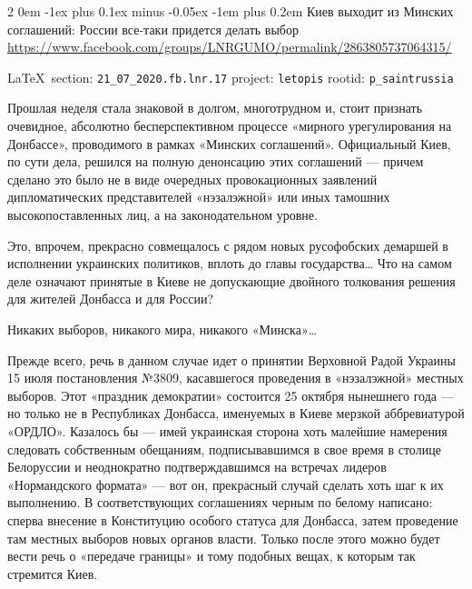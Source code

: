 \documentclass[a4paper,11pt]{extreport}
\makeatletter
\renewcommand\subsection{%
  \clearpage
    \@startsection{subsection}%
    {2}%
    {0em}%
    {-1ex plus 0.1ex minus -0.05ex}%
    {-1em plus 0.2em}%
    {\scshape\bfseries\Large}%
}
\makeatother
\begin{document}
 
\subsection{Киев выходит из Минских соглашений: России все-таки придется делать выбор}
\label{sec:21_07_2020.fb.lnr.17}
\url{https://www.facebook.com/groups/LNRGUMO/permalink/2863805737064315/}
  
\vspace{0.5cm}
{\small\LaTeX~section: \verb|21_07_2020.fb.lnr.17| project: \verb|letopis| rootid: \verb|p_saintrussia|}
\vspace{0.5cm}


Прошлая неделя стала знаковой в долгом, многотрудном и, стоит признать
очевидное, абсолютно бесперспективном процессе «мирного урегулирования на
Донбассе», проводимого в рамках «Минских соглашений». Официальный Киев, по сути
дела, решился на полную денонсацию этих соглашений --- причем сделано это было не
в виде очередных провокационных заявлений дипломатических представителей
«нэзалэжной» или иных тамошних высокопоставленных лиц, а на законодательном
уровне.

Это, впрочем, прекрасно совмещалось с рядом новых русофобских демаршей в
исполнении украинских политиков, вплоть до главы государства… Что на самом деле
означают принятые в Киеве не допускающие двойного толкования решения для
жителей Донбасса и для России?

Никаких выборов, никакого мира, никакого «Минска»…

Прежде всего, речь в данном случае идет о принятии Верховной Радой Украины 15
июля постановления №3809, касавшегося проведения в «нэзалэжной» местных
выборов. Этот «праздник демократии» состоится 25 октября нынешнего года --- но
только не в Республиках Донбасса, именуемых в Киеве мерзкой аббревиатурой
«ОРДЛО». Казалось бы --- имей украинская сторона хоть малейшие намерения
следовать собственным обещаниям, подписывавшимся в свое время в столице
Белоруссии и неоднократно подтверждавшимся на встречах лидеров «Нормандского
формата» --- вот он, прекрасный случай сделать хоть шаг к их выполнению. В
соответствующих соглашениях черным по белому написано: сперва внесение в
Конституцию особого статуса для Донбасса, затем проведение там местных выборов
новых органов власти. Только после этого можно будет вести речь о «передаче
границы» и тому подобных вещах, к которым так стремится Киев.
\end{document}
